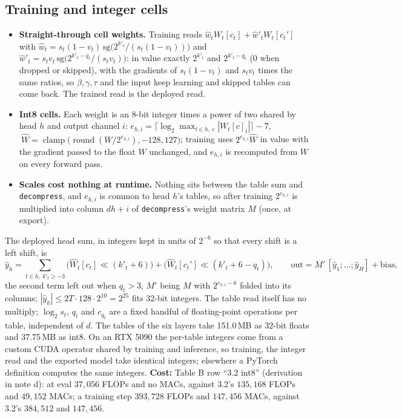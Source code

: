 \documentclass[10pt]{article}
\newcommand{\code}[1]{{\renewcommand{\_}{\textunderscore\allowbreak}\texttt{#1}}}
\begin{document}
\subsection*{Training and integer cells}
\begin{itemize}\setlength\itemsep{1pt}
\item \textbf{Straight-through cell weights.} Training reads $\hat w_tW_t[c_t]+\hat w'_tW_t[c_t']$ with $\hat w_t=s_t(1-v_t)\,\mathrm{sg}\big(2^{k'_t}/(s_t(1-v_t))\big)$ and
  $\hat w'_t=s_tv_t\,\mathrm{sg}\big(2^{k'_t-q_t}/(s_tv_t)\big)$: in value exactly $2^{k'_t}$ and $2^{k'_t-q_t}$ ($0$ when dropped or skipped), with the gradients of $s_t(1-v_t)$ and $s_tv_t$
  times the same ratios, so $\beta,\gamma,\tau$ and the input keep learning and skipped tables can come back. The trained read is the deployed read.
\item \textbf{Int8 cells.} Each weight is an 8-bit integer times a power of two shared by head $h$ and output channel $i$:
  $e_{h,i}=\big\lceil\log_2\max_{t\in h,\ c}|W_t[c]_i|\big\rceil-7$, $\ \hat W=\operatorname{clamp}\big(\operatorname{round}(W/2^{e_{h,i}}),-128,127\big)$;
  training uses $2^{e_{h,i}}\hat W$ in value with the gradient passed to the float $W$ unchanged, and $e_{h,i}$ is recomputed from $W$ on every forward pass.
\item \textbf{Scales cost nothing at runtime.} Nothing sits between the table sum and \code{decompress}, and $e_{h,i}$ is common to head $h$'s tables, so after training
  $2^{e_{h,i}}$ is multiplied into column $dh+i$ of \code{decompress}'s weight matrix $M$ (once, at export).
\end{itemize}
The deployed head sum, in integers kept in units of $2^{-6}$ so that every shift is a left shift, is
\[
\hat y_h=\sum_{t\in h,\ k'_t\ge-3}\big(\hat W_t[c_t]\ll(k'_t+6)\big)+\big(\hat W_t[c_t']\ll(k'_t+6-q_t)\big),\qquad \text{out}=M'\,[\hat y_1;\dots;\hat y_H]+\text{bias},
\]
the second term left out when $q_t>3$, $M'$ being $M$ with $2^{e_{h,i}-6}$ folded into its columns; $|\hat y_h|\le2T\cdot128\cdot2^{10}=2^{25}$ fits 32-bit integers.
The table read itself has no multiply; $\log_2s_t$, $q_t$ and $c_{q_t}$ are a fixed handful of floating-point operations per table, independent of $d$.
The tables of the six layers take 151.0\,MB as 32-bit floats and 37.75\,MB as int8.
On an RTX 5090 the per-table integers come from a custom CUDA operator shared by training and inference, so training, the integer read and the exported model take
identical integers; elsewhere a PyTorch definition computes the same integers.
\textbf{Cost:} Table B row ``3.2 int8'' (derivation in note d): at eval $37{,}056$ FLOPs and no MACs, against 3.2's $135{,}168$ FLOPs and $49{,}152$ MACs;
a training step $393{,}728$ FLOPs and $147{,}456$ MACs, against 3.2's $384{,}512$ and $147{,}456$.
\end{document}
